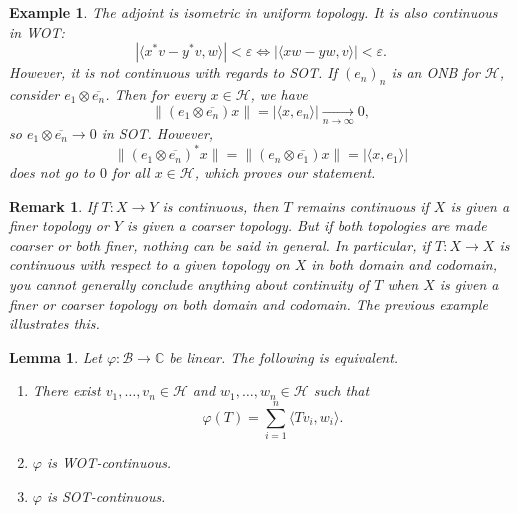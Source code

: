 \documentclass[10pt, a4paper]{article}
\newtheorem*{remark}{Remark}
\newtheorem{example}[thm]{Example}
\newtheorem{lemma}[thm]{Lemma}
\newcommand{\C}{\mathbb {C}}
\begin{document}
\begin{example}
  The adjoint is isometric in uniform topology. It is also continuous in WOT:
  $$|\langle x^* v - y^* v, w \rangle| < \varepsilon \Leftrightarrow |\langle xw - yw, v\rangle| < \varepsilon.$$
  However, it is not continuous with regards to SOT. If $(e_n)_n$ is an ONB for $\mathcal{H}$, consider $e_1 \otimes \overline{e_n}$.
  Then for every $x \in \mathcal{H}$, we have 
  $$\|(e_1 \otimes \overline{e_n}) x \| = |\langle x, e_n \rangle | \xrightarrow[n \to \infty]{} 0,$$
  so $e_1 \otimes \overline{e_n} \to 0$ in SOT. However,
  $$\| (e_1 \otimes \overline{e_n})^* x\| = \| (e_n \otimes \overline{e_1}) x\| = |\langle x, e_1 \rangle |$$
  does not go to $0$ for all $x \in \mathcal{H}$, which proves our statement.
\end{example}

\begin{remark}
  If $T:X\to Y$ is continuous, then $T$ remains continuous if $X$ is given a finer topology or $Y$ is given a coarser topology. 
  But if both topologies are made coarser or both finer, nothing can be said in general. In particular, if $T:X\to X$ is 
  continuous with respect to a given topology on $X$ in both domain and codomain, you cannot generally conclude anything 
  about continuity of $T$ when $X$ is given a finer or coarser topology on both domain and codomain. The previous example illustrates this.
\end{remark}

\begin{lemma}
  Let $\varphi: \mathcal{B} \to \C$ be linear. The following is equivalent.
  \begin{enumerate}
    \item There exist $v_1, \dots, v_n \in \mathcal{H}$ and $w_1, \dots, w_n \in \mathcal{H}$ such that 
    $$\varphi (T) = \sum_{i = 1} ^n \langle T v_i, w_i \rangle.$$
    \item $\varphi$ is WOT-continuous.
    \item $\varphi$ is SOT-continuous.
  \end{enumerate}
\end{lemma}
\end{document}
